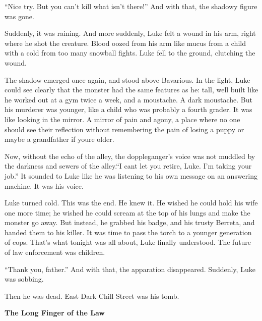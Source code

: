 ``Nice try. But you can't kill what isn't there!'' And with that, the
shadowy figure was gone.



Suddenly, it was raining. And more suddenly, Luke felt a wound in
his arm, right where he shot the creature. Blood oozed from his arm
like mucus from a child with a cold from too many snowball fights.
Luke fell to the ground, clutching the wound.





The shadow emerged once again, and stood above Bavarious. In the
light, Luke could see clearly that the monster had the same
features as he: tall, well built like he worked out at a gym twice
a week, and a moustache. A dark moustache. But his murderer was
younger, like a child who was probably a fourth grader. It was like
looking in the mirror. A mirror of pain and agony, a place where no
one should see their reflection without remembering the pain of
losing a puppy or maybe a grandfather if youre older.



Now, without the echo of the alley, the doppleganger's voice was
not muddled by the darkness and sewers of the alley.``I cant let you
retire, Luke. I'm taking your job.'' It sounded to Luke like he was
listening to his own message on an answering machine. It was his
voice.



Luke turned cold. This was the end. He knew it. He wished he could
hold his wife one more time; he wished he could scream at the top
of his lungs and make the monster go away. But instead, he grabbed
his badge, and his trusty Berreta, and handed them to his killer.
It was time to pass the torch to a younger generation of cops.
That's what tonight was all about, Luke finally understood. The
future of law enforcement was children.



``Thank you, father.'' And with that, the apparation disappeared.
Suddenly, Luke was sobbing.



Then he was dead. East Dark Chill Street was his tomb. 

 





{\bf The Long Finger of the Law}



